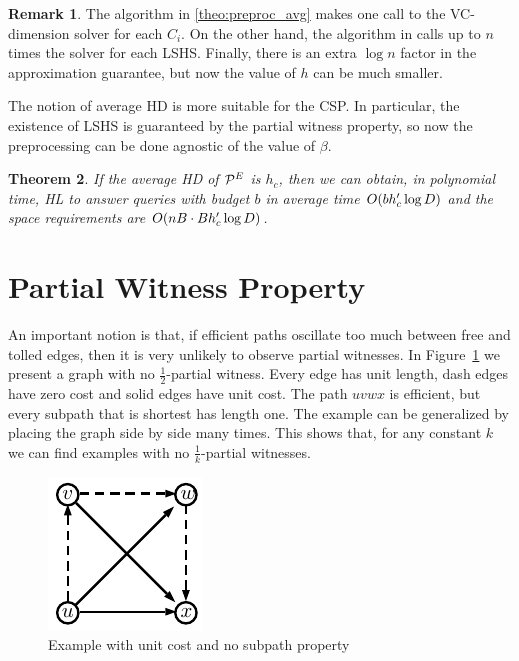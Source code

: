 \documentclass[letterpaper,11pt]{article}
\theoremstyle{plain}
\newtheorem{theorem}{Theorem}[section]
\theoremstyle{definition}
\newtheorem{remark}[theorem]{Remark}
\begin{document}
\begin{remark}
The algorithm in \cref{theo:preproc_avg} makes one call to the VC-dimension solver for each $C_i$.
On the other hand, the algorithm in \cite{highway2013} calls up to $n$ times the solver for each LSHS.
Finally, there is an extra $\log n$ factor in the approximation guarantee, but now the value of $h$ can be much smaller.
\end{remark}

The notion of average HD is more suitable for the CSP.
In particular, the existence of LSHS is guaranteed by the partial witness property, so now the preprocessing can be done agnostic of the value of $\beta$.

\begin{theorem}
If the average HD of $\mathcal{P}^E$ is $h_c$, then we can obtain, in polynomial time, HL to answer queries with budget $b$ in average time $O(bh_c'\log D)$ and the space requirements are $O(nB\cdot Bh_c'\log D)$.
\end{theorem}

\section{Partial Witness Property}

An important notion is that, if efficient paths oscillate too much between free and tolled edges, then it is very unlikely to observe partial witnesses.
In Figure~\ref{fig:nosubpath} we present a graph with no $\frac{1}{2}$-partial witness.
Every edge has unit length, dash edges have zero cost and solid edges have unit cost.
The path $uvwx$ is efficient, but every subpath that is shortest has length one.
The example can be generalized by placing the graph side by side many times.
This shows that, for any constant $k$ we can find examples with no $\frac{1}{k}$-partial witnesses.


\begin{figure}
\caption{Example with unit cost and no subpath property}
\label{fig:nosubpath}
\centering
\includegraphics[scale=1.3]{TexImg/Nosubpath.pdf}
\end{figure}



\end{document}
